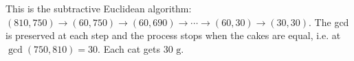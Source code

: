 This is the subtractive Euclidean algorithm: $(810,750)\to(60,750)\to(60,690)\to\cdots\to(60,30)\to(30,30)$. The gcd is preserved at each step and the process stops when the cakes are equal, i.e. at $\gcd(750,810)=30$. Each cat gets $\boxed{30\text{ g}}$.
